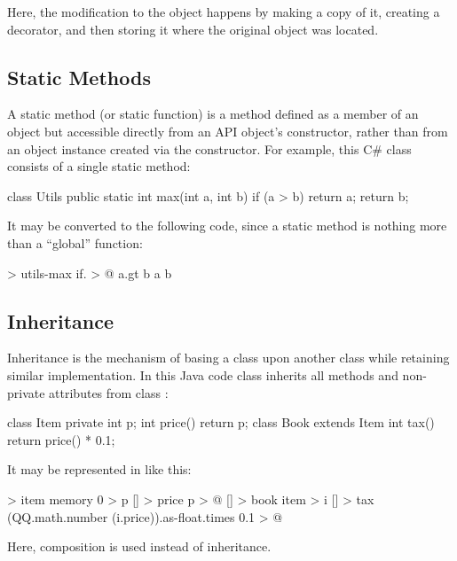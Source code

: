 \documentclass[sigplan,nonacm]{acmart}
\begin{document}
Here, the modification to the object  happens by making a copy of it, creating a decorator, and then storing it where the original object was located.

\subsection{Static Methods}
\label{sec:static}

A static method (or static function) is a method defined as a member of an object but accessible directly from an API object's constructor, rather than from an object instance created via the constructor. For example, this C\# class consists of a single static method:

\begin{ffcode}
class Utils {
  public static int max(int a, int b) {
    if (a > b) return a;
    return b;
  }
}
\end{ffcode}

It may be converted to the following \eolang{} code, since a static method is nothing more than a ``global'' function:

\begin{ffcode}
[a b] > utils-max
  if. > @
    a.gt b
    a
    b
\end{ffcode}

\subsection{Inheritance}
\label{sec:inheritance}

Inheritance is the mechanism of basing a class upon another class while retaining similar implementation. In this Java code class  inherits all methods and non-private attributes from class :

\begin{ffcode}
class Item {
  private int p;
  int price() { return p; }
}
class Book extends Item {
  int tax() { return price() * 0.1; }
}
\end{ffcode}

It may be represented in \eolang{} like this:

\begin{ffcode}
[] > item
  memory 0 > p
  [] > price
    p > @
[] > book
  item > i
  [] > tax
    (QQ.math.number (i.price)).as-float.times 0.1 > @
\end{ffcode}

Here, composition is used instead of inheritance.
\end{document}
